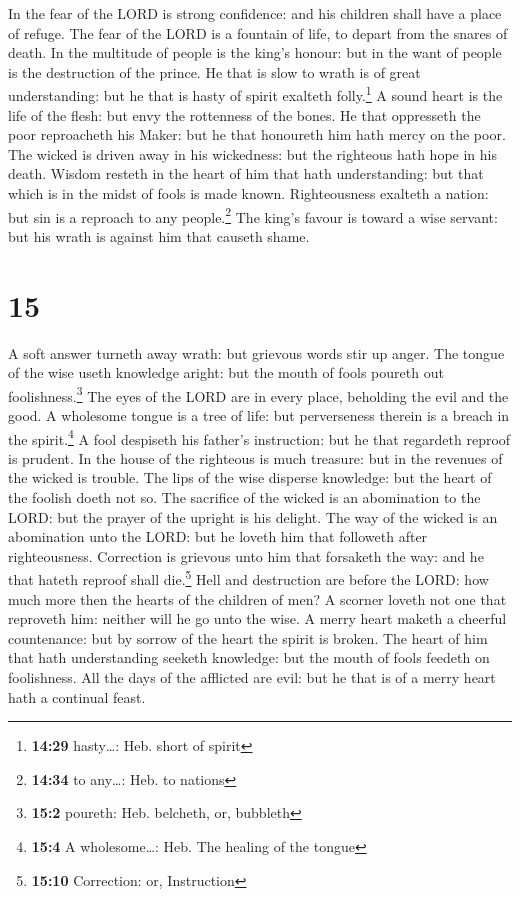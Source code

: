  In the fear of the LORD is strong confidence: and his
children shall have a place of refuge.  The fear of the
LORD is a fountain of life, to depart from the snares of death.
 In the multitude of people is the king's honour: but in
the want of people is the destruction of the prince.  He
that is slow to wrath is of great understanding: but he that is hasty of
spirit exalteth folly.\footnote{\textbf{14:29} hasty\ldots: Heb. short
  of spirit}  A sound heart is the life of the flesh: but
envy the rottenness of the bones.  He that oppresseth the
poor reproacheth his Maker: but he that honoureth him hath mercy on the
poor.  The wicked is driven away in his wickedness: but
the righteous hath hope in his death.  Wisdom resteth in
the heart of him that hath understanding: but that which is in the midst
of fools is made known.  Righteousness exalteth a nation:
but sin is a reproach to any people.\footnote{\textbf{14:34} to
  any\ldots: Heb. to nations}  The king's favour is
toward a wise servant: but his wrath is against him that causeth shame.

\hypertarget{section-14}{%
\section{15}\label{section-14}}

 A soft answer turneth away wrath: but grievous words stir
up anger.  The tongue of the wise useth knowledge aright:
but the mouth of fools poureth out foolishness.\footnote{\textbf{15:2}
  poureth: Heb. belcheth, or, bubbleth}  The eyes of the
LORD are in every place, beholding the evil and the good. 
A wholesome tongue is a tree of life: but perverseness therein is a
breach in the spirit.\footnote{\textbf{15:4} A wholesome\ldots: Heb. The
  healing of the tongue}  A fool despiseth his father's
instruction: but he that regardeth reproof is prudent.  In
the house of the righteous is much treasure: but in the revenues of the
wicked is trouble.  The lips of the wise disperse
knowledge: but the heart of the foolish doeth not so.  The
sacrifice of the wicked is an abomination to the LORD: but the prayer of
the upright is his delight.  The way of the wicked is an
abomination unto the LORD: but he loveth him that followeth after
righteousness.  Correction is grievous unto him that
forsaketh the way: and he that hateth reproof shall die.\footnote{\textbf{15:10}
  Correction: or, Instruction}  Hell and destruction are
before the LORD: how much more then the hearts of the children of men?
 A scorner loveth not one that reproveth him: neither
will he go unto the wise.  A merry heart maketh a
cheerful countenance: but by sorrow of the heart the spirit is broken.
 The heart of him that hath understanding seeketh
knowledge: but the mouth of fools feedeth on foolishness.
 All the days of the afflicted are evil: but he that is
of a merry heart hath a continual feast.

